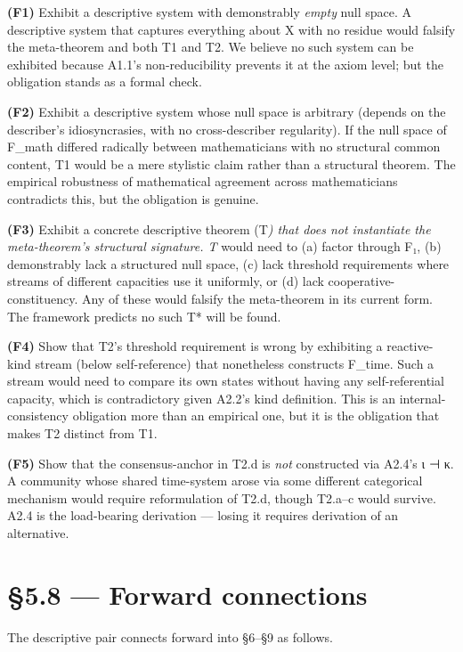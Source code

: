\documentclass[11pt, openany]{book}
\newcommand{\sectionbreak}{\clearpage}
\begin{document}
\textbf{(F1)} Exhibit a descriptive system with demonstrably \textit{empty} null space. A descriptive system that captures everything about X with no residue would falsify the meta-theorem and both T1 and T2. We believe no such system can be exhibited because A1.1's non-reducibility prevents it at the axiom level; but the obligation stands as a formal check.

\textbf{(F2)} Exhibit a descriptive system whose null space is arbitrary (depends on the describer's idiosyncrasies, with no cross-describer regularity). If the null space of F\_\allowbreak{}math differed radically between mathematicians with no structural common content, T1 would be a mere stylistic claim rather than a structural theorem. The empirical robustness of mathematical agreement across mathematicians contradicts this, but the obligation is genuine.

\textbf{(F3)} Exhibit a concrete descriptive theorem (T\textit{) that does not instantiate the meta-theorem's structural signature. T} would need to (a) factor through F₁, (b) demonstrably lack a structured null space, (c) lack threshold requirements where streams of different capacities use it uniformly, or (d) lack cooperative-constituency. Any of these would falsify the meta-theorem in its current form. The framework predicts no such T* will be found.

\textbf{(F4)} Show that T2's threshold requirement is wrong by exhibiting a reactive-kind stream (below self-reference) that nonetheless constructs F\_\allowbreak{}time. Such a stream would need to compare its own states without having any self-referential capacity, which is contradictory given A2.2's kind definition. This is an internal-consistency obligation more than an empirical one, but it is the obligation that makes T2 distinct from T1.

\textbf{(F5)} Show that the consensus-anchor in T2.d is \textit{not} constructed via A2.4's ι ⊣ κ. A community whose shared time-system arose via some different categorical mechanism would require reformulation of T2.d, though T2.a–c would survive. A2.4 is the load-bearing derivation --- losing it requires derivation of an alternative.

\sectionbreak

\section{§5.8 --- Forward connections}

The descriptive pair connects forward into §6–§9 as follows.
\end{document}

